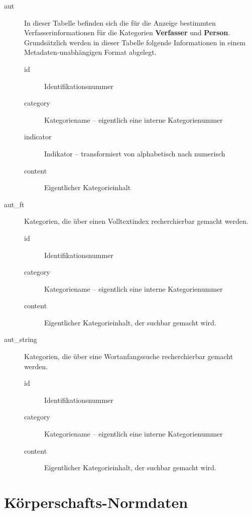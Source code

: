 \documentclass[11pt, twoside, a4paper, BCOR8mm, DIV12, bibtotoc,idxtotoc]{scrbook}
\begin{document}
\begin{description}
\item[aut] In dieser Tabelle befinden sich die für die Anzeige
  bestimmten Verfasserinformationen für die Kategorien
  \textbf{Verfasser} und \textbf{Person}. Grundsätzlich werden in
  dieser Tabelle folgende Informationen in einem
  Metadaten-unabhängigen Format abgelegt.
  \begin{description}
  \item[id] Identifikationsnummer
  \item[category] Kategoriename -- eigentlich eine interne Kategorienummer
  \item[indicator] Indikator -- transformiert von alphabetisch nach numerisch
  \item[content] Eigentlicher Kategorieinhalt
  \end{description}
\item[aut\_ft] Kategorien, die über einen Volltextindex recherchierbar
  gemacht werden.
  \begin{description}
  \item[id] Identifikationsnummer
  \item[category] Kategoriename -- eigentlich eine interne Kategorienummer
  \item[content] Eigentlicher Kategorieinhalt, der suchbar gemacht wird.
  \end{description}
\item[aut\_string] Kategorien, die über eine Wortanfangssuche
  recherchierbar gemacht werden.
  \begin{description}
  \item[id] Identifikationsnummer
  \item[category] Kategoriename -- eigentlich eine interne Kategorienummer
  \item[content] Eigentlicher Kategorieinhalt, der suchbar gemacht wird.
  \end{description}
\end{description}

\section{Körperschafts-Normdaten}
\end{document}
